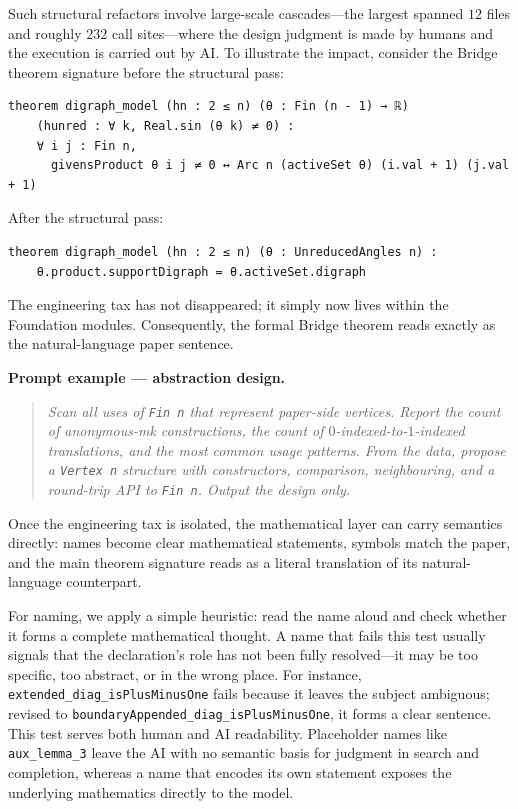 Such structural refactors involve large-scale cascades---the largest spanned
$12$ files and roughly $232$ call sites---where the design judgment is
made by humans and the execution is carried out by AI. To illustrate the impact, consider the Bridge theorem signature before the 
structural pass:
\begin{lstlisting}
theorem digraph_model (hn : 2 ≤ n) (θ : Fin (n - 1) → ℝ)
    (hunred : ∀ k, Real.sin (θ k) ≠ 0) :
    ∀ i j : Fin n,
      givensProduct θ i j ≠ 0 ↔ Arc n (activeSet θ) (i.val + 1) (j.val + 1)
\end{lstlisting}
After the structural pass:
\begin{lstlisting}
theorem digraph_model (hn : 2 ≤ n) (θ : UnreducedAngles n) :
    θ.product.supportDigraph = θ.activeSet.digraph
\end{lstlisting}
The engineering tax has not disappeared; it simply now lives within the Foundation
modules. Consequently, the formal Bridge theorem reads exactly as the 
natural-language paper sentence.

\medskip
\noindent\textbf{Prompt example --- abstraction design.}
\begin{quote}\itshape\small
Scan all uses of \texttt{Fin n} that represent paper-side vertices.
Report the count of anonymous-mk constructions, the count of
$0$-indexed-to-$1$-indexed translations, and the most common usage
patterns. From the data, propose a \texttt{Vertex n} structure with
constructors, comparison, neighbouring, and a round-trip API to
\texttt{Fin n}. Output the design only.
\end{quote}


Once the engineering tax is isolated, the mathematical layer can carry
semantics directly: names become clear mathematical statements, symbols
match the paper, and the main theorem signature reads as a literal
translation of its natural-language counterpart.

For naming, we apply a simple heuristic: read the name aloud and check
whether it forms a complete mathematical thought. A name that fails
this test usually signals that the declaration's role has not been fully
resolved---it may be too specific, too abstract, or in the wrong place. 
For instance, \texttt{extended\_diag\_isPlusMinusOne} fails because it 
leaves the subject ambiguous; revised to 
\texttt{boundaryAppended\_diag\_isPlusMinusOne}, it forms a clear sentence. 
This test serves both human and AI readability. Placeholder names like 
\texttt{aux\_lemma\_3} leave the AI with no semantic basis for judgment in 
search and completion, whereas a name that encodes its own statement exposes 
the underlying mathematics directly to the model.

